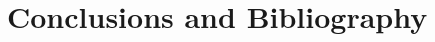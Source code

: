 \documentclass[11pt]{report}  %
\numberwithin{equation}{section}
\begin{document}



\chapter{Conclusions and Bibliography}






















\end{document}
